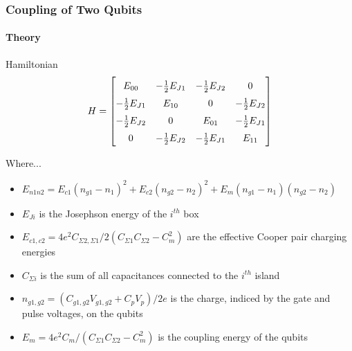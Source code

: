 \documentclass{beamer}
\begin{document}
\begin{frame}
    \frametitle{Coupling of Two Qubits}
    \framesubtitle{Theory}
    \begin{block}{Hamiltonian}
        \fontsize{8}{7.2}\selectfont
        $$
        H=
        \begingroup
            \renewcommand*{\arraystretch}{1.5}
            \begin{bmatrix}
                E_{00} & -\frac{1}{2}E_{J1} & -\frac{1}{2}E_{J2} & 0 \\
                -\frac{1}{2}E_{J1} & E_{10} & 0 & -\frac{1}{2}E_{J2} \\
                -\frac{1}{2}E_{J2} & 0 & E_{01} & -\frac{1}{2}E_{J1} \\
                0 & -\frac{1}{2}E_{J2} & -\frac{1}{2}E_{J1} & E_{11}
            \end{bmatrix}
        \endgroup
        $$
        
        Where...
        \begin{itemize}
            \item $E_{n1n2}=E_{c1}(n_{g1}-n_1)^2 + E_{c2}(n_{g2}-n_2)^2 + E_{m}(n_{g1}-n_1)(n_{g2}-n_2)$
            \item $E_{Ji}$ is the Josephson energy of the $i^{th}$ box
            \item $E_{c1,c2}=4e^2C_{\Sigma 2,\Sigma 1} / 2(C_{\Sigma 1} C_{\Sigma 2} - C_m^2)$ are the effective Cooper pair charging energies
            \item $C_{\Sigma i}$ is the sum of all capacitances connected to the $i^{th}$ island
            \item $n_{g1,g2}=(C_{g1,g2}V_{g1,g2}+C_pV_p)/2e$ is the charge, indiced by the gate and pulse voltages, on the qubits
            \item $E_m=4e^2C_m/(C_{\Sigma 1}C_{\Sigma 2}-C_m^2)$ is the coupling energy of the qubits
        \end{itemize}
    \end{block}
\end{frame}

\end{document}
